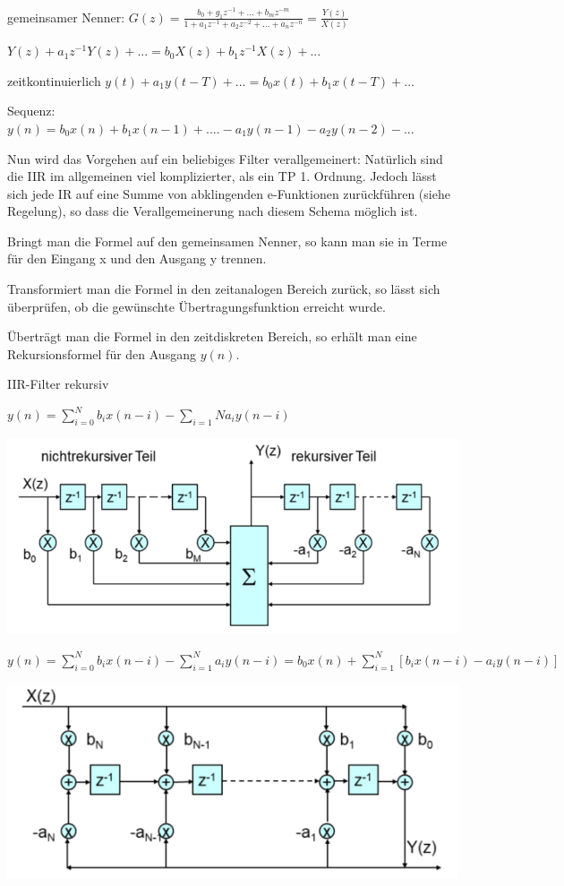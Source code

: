 \documentclass[a4paper]{article}
\begin{document}
\begin{multicols}{3}
\begin{itemize*}
    \item gemeinsamer Nenner: $G(z)=\frac{b_0+g_1z^{-1}+...+b_mz^{-m}}{1+a_1z^{-1}+a_2z^{-2}+...+a_nz^{-n}}=\frac{Y(z)}{X(z)}$
    \item $Y(z)+a_1z^{-1} Y(z)+... =b_0X(z)+b_1z^{-1}X(z)+...$
    \item zeitkontinuierlich $y(t)+a_1y(t-T)+... = b_0x(t)+b_1x(t-T)+...$
    \item Sequenz: $y(n)=b_0x(n) +b_1x(n-1)+.... -a_1y(n-1)-a_2y(n-2)-...$
    \item Nun wird das Vorgehen auf ein beliebiges Filter verallgemeinert: Natürlich sind die IIR im allgemeinen viel komplizierter, als ein TP 1. Ordnung. Jedoch lässt sich jede IR auf eine Summe von abklingenden e-Funktionen zurückführen (siehe Regelung), so dass die Verallgemeinerung nach diesem Schema möglich ist.
    \item Bringt man die Formel auf den gemeinsamen Nenner, so kann man sie in Terme für den Eingang x und den Ausgang y trennen.
    \item Transformiert man die Formel in den zeitanalogen Bereich zurück, so lässt sich überprüfen, ob die gewünschte Übertragungsfunktion erreicht wurde.
    \item Überträgt man die Formel in den zeitdiskreten Bereich, so erhält man eine Rekursionsformel für den Ausgang $y(n)$.
  \end{itemize*}

  IIR-Filter rekursiv

  \begin{itemize*}
    \item $y(n)=\sum_{i=0}^{N} b_ix(n-i) - \sum_{i=1}{N} a_iy(n-i)$
    \item \includegraphics[width=.5\linewidth]{Assets/Biosignalverarbeitung-iir-rekursiv.png}
    \item $y(n)=\sum_{i=0}^N b_ix(n-i) - \sum_{i=1}^N a_iy(n-i) = b_0x(n)+ \sum_{i=1}^N [b_ix(n-i) - a_iy(n-i)]$
    \item \includegraphics[width=.5\linewidth]{Assets/Biosignalverarbeitung-iir-rekursiv-2.png}
  \end{itemize*}


\end{multicols}
\end{document}
